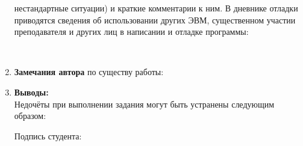 \begin{enumerate}
\begin{footnotesize}
		нестандартные ситуации) и краткие комментарии к ним. В дневнике отладки приводятся сведения об использовании других ЭВМ,
		существенном участии преподавателя и других лиц в написании и отладке программы:
	\end{footnotesize}
	\\
	\Debugging
	\item \textbf{Замечания автора} по существу работы: \AuthorsRemarks
	\item \textbf{Выводы:} \Conclusions
	\\
	Недочёты при выполнении задания могут быть устранены следующим образом: \Defects
	\begin{flushright}
		Подпись студента:
	\end{flushright}
\end{enumerate}